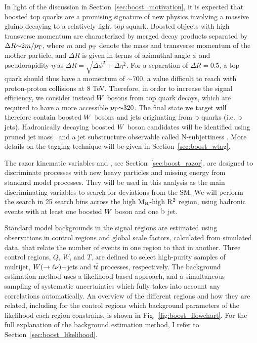 

In light of the discussion in Section~\ref{sec:boost_motivation}, it is expected that boosted top
quarks are a promising signature of new physics involving a massive gluino decaying to a relatively
light top squark. 
Boosted objects with high transverse momentum are characterized by merged decay products
separated by $ \Delta R {\sim} 2 m / p_{\mathrm{T}} $, where $m$ and $p_{\mathrm{T}}$ denote the mass and transverse
momentum of the mother particle, and $\Delta R$ is given in terms of azimuthal angle $\phi$ and
pseudorapidity $\eta$ as $\Delta R = \sqrt{\Delta \phi^2 + \Delta \eta^2}$.
For a separation of $\Delta R = 0.5$, a top quark should thus have a momentum of ${\sim}700$\GeV, a
value difficult to reach with proton-proton collisions at 8 TeV. Therefore, in order to increase the
signal efficiency, we consider instead $W$ bosons from top quark decays, which are required to have
a more accessible $p_{\mathrm{T}} {\sim} 320$\GeV.  The final state we target will therefore contain boosted
$W$ bosons and jets originating from $\mathrm{b}$ quarks (i.e. $\mathrm{b}$ jets).
Hadronically decaying boosted $W$ boson candidates will be identified using pruned jet
mass~\cite{Ellis:2009su,Ellis:2009me,Chatrchyan:2013vbb} and a jet substructure observable
called N-subjettiness \cite{Thaler:2010tr}. More details on the \W tagging technique will be given
in Section~\ref{sec:boost_wtag}. 

The razor kinematic variables \mr and \rsq, see Section~\ref{sec:boost_razor}, are designed to
discriminate processes with new heavy particles and missing energy from standard model processes.
They will be used in this analysis as the main discriminating variables to search for deviations
from the SM. We will perform the search in 25 search bins across the high $\mathrm{M_R}$-high $\mathrm{R^2}$ region,
using hadronic events with at least one boosted $W$ boson and one $\mathrm{b}$ jet.  

Standard model backgrounds in the signal regions are estimated using observations in control regions
and global scale factors, calculated from simulated data, that relate the number of events in one
region to that in another. 
Three control regions, $Q$, $W$, and $T$, are defined to select high-purity samples of multijet,
$W(\rightarrow \ell\nu)+$jets and $t\bar{t}$ processes, respectively.  
The background estimation method uses a likelihood-based approach, and a simultaneous sampling
of systematic uncertainties which fully takes into account any correlations automatically.
An overview of the different regions and how they are related, including for the control regions
which background parameters of the likelihood each region constrains, is shown in
Fig.~\ref{fig:boost_flowchart}. For the full explanation of the background estimation method, I
refer to Section~\ref{sec:boost_likelihood}. 

